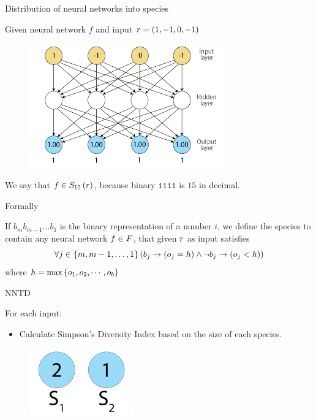 \begin{frame}{Distribution of neural networks into species}
\begin{center}
Given neural network $f$ and input $r = (1, -1, 0, -1)$
  \begin{figure}[p]
  \includegraphics[width=0.75\textwidth]{images/nntdexample3.png}
  \end{figure}
We say that $f \in S_{15}\left(r\right)$, because binary $\texttt{1111}$ is $15$ in decimal.
\end{center}
\end{frame}

\begin{frame}{Formally}
\begin{center}
If $b_{m}b_{m-1}\dots b_1$ is the binary representation of a number $i$, we define the species  to contain any neural network $f \in F$, that given $r$ as input satisfies
\begin{equation}
  \forall j \in \left\{ m, m-1, \dots, 1 \right\} \left(b_j \rightarrow (o_j = h) \wedge \neg b_j \rightarrow (o_j < h)\right)
\end{equation}
where $h = \max\left\{ o_1, o_2, \cdots, o_b \right\}$
\end{center}
\end{frame}

\begin{frame}{NNTD}
\begin{center}
For each input:
  \begin{itemize}
	  \item Calculate Simpson's Diversity Index based on the size of each species.
  \end{itemize}
     \begin{figure}[p]
  \includegraphics[width=0.4\textwidth]{images/speciessize.png}
  \end{figure}
\end{center}
\end{frame}

